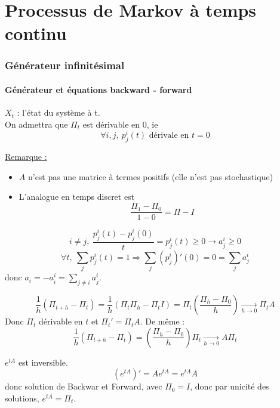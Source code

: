 \part{Processus de Markov \`a temps continu}

\section{Générateur infinitésimal}
\subsection{Générateur et équations backward - forward}
$X_t$ : l'état du système à t.\\
On admettra que $\Pi_t$ est dérivable en 0, ie
	\[\forall i,j,\ p_j^i(t) \text{ dérivale en } t=0\]


\underline{Remarque :} \begin{itemize}
	\item $A$ n'est pas une matrice à termes positifs (elle n'est pas stochastique)
	\item L'analogue en temps discret est
		\[\frac{\Pi_1-\Pi_0}{1-0}=\Pi-I\]
\end{itemize}


\begin{dem}
	\[i\neq j,\ \frac{p_j^i(t)-p_j^i(0)}{t}=p_j^i(t)\geq 0 \to a_j^i\geq 0\]
	\[\forall t,\ \sum_j p_j^i(t)=1\Rightarrow \sum_j (p_j^i)'(0)=0=\sum_j a_j^i\]
donc $a_i=-a_i^i=\sum_{j\neq i} a_j^i$.
\end{dem}


\begin{dem}
\[\frac{1}{h}(\Pi_{t+h}-\Pi_t)=\frac{1}{h}(\Pi_t\Pi_h-\Pi_tI)=\Pi_t \left( \frac{\Pi_h-\Pi_0}{h}\right) \xrightarrow[h\to 0]{} \Pi_t A\]
Donc $\Pi_t$ dérivable en $t$ et $\Pi_t'=\Pi_t A$. De même :
\[\frac{1}{h}(\Pi_{t+h}-\Pi_t)=\left(\frac{\Pi_h-\Pi_0}{h}\right)\Pi_t\xrightarrow[h\to0]{}A\Pi_t\]

\bigskip
$e^{tA}$ est inversible.
	\[\left(e^{tA}\right)'=Ae^{tA}=e^{tA}A\]
donc solution de Backwar et Forward, avec $\Pi_0=I$, donc par unicité des solutions, $e^{tA}=\Pi_t$. 
\end{dem}

